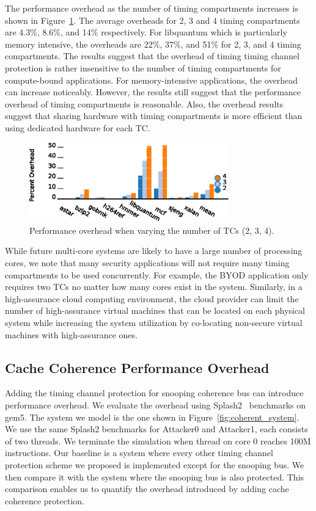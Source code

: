 The performance overhead as the number of timing compartments increases is 
shown in Figure~\ref{fig:scalability}. The average overheads %
for 2, 3 and 4 timing compartments are 4.3\%, 8.6\%, and 14\% 
respectively. For libquantum which is particularly memory intensive, the 
overheads are 22\%, 37\%, and 51\% for 2, 3, and 4 timing compartments. The 
results suggest that the overhead of timing timing channel protection is rather 
insensitive to the number of timing compartments for compute-bound 
applications. For memory-intensive applications, the overhead can increase 
noticeably. However, the results still suggest that the performance overhead
of timing compartments is reasonable. Also, the overhead results suggest
that sharing hardware with timing compartments is more efficient than
using dedicated hardware for each TC.

\begin{figure}
    \begin{center}
        \includegraphics[width=3.4in]{figs/scalability.eps}
        \caption{Performance overhead when varying the number of TCs (2, 3, 4).}
        \label{fig:scalability}
    \end{center}
\end{figure}

While future multi-core systems are likely to have a large number of processing 
cores, we note that many security applications will not require many timing 
compartments to be used concurrently. For example, the BYOD application only 
requires two TCs no matter how many cores exist in the system. Similarly, in a 
high-assurance cloud computing environment, the cloud provider can limit the
number of high-assurance virtual machines that can be located on each physical
system while increasing the system utilization by co-locating non-secure
virtual machines with high-assurance ones.

\subsection{Cache Coherence Performance Overhead}

Adding the timing channel protection for snooping coherence bus can introduce 
performance overhead. We evaluate the overhead using Splash2~\cite{splash2} benchmarks on 
gem5. The system we model is the one shown in Figure~\ref{fig:coherent_system}.
We use the same Splash2 benchmarks for Attacker0 and Attacker1, each consists 
of two threads. We terminate the simulation
when thread on core 0 reaches 100M instructions.  Our baseline is a system 
where every other timing channel protection scheme we proposed is implemented 
except for the snooping bus.
We then compare it with the system where the snooping bus is also protected. 
This comparison enables us to quantify the overhead introduced by adding 
cache coherence protection. 

